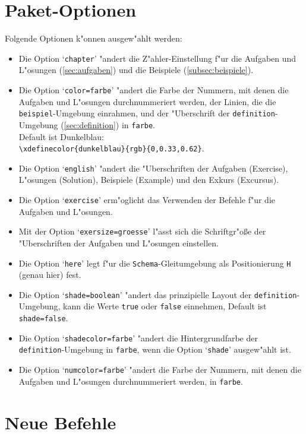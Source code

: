 \documentclass[a4paper,10pt,headsepline]{scrartcl}
\newcommand{\option}[1]{`\texttt{#1}'\xspace}
\begin{document}
\section{Paket-Optionen}
Folgende Optionen k"onnen ausgew"ahlt werden:
\begin{itemize}
 \item Die Option \option{chapter} "andert die Z"ahler-Einstellung f"ur die Aufgaben und L"osungen (\ref{sec:aufgaben}) und die Beispiele (\ref{subsec:beispiele}).%
 \item Die Option \option{color=farbe} "andert die Farbe der Nummern, mit denen die Aufgaben und L"osungen durchnummeriert werden, der Linien, die die \texttt{beispiel}-Umgebung einrahmen, und der "Uberschrift der \texttt{definition}-Umgebung (\ref{sec:definition}) in \texttt{far\-be}.\\ Default ist Dunkelblau:\\\verb=\xdefinecolor{dunkelblau}{rgb}{0,0.33,0.62}=.
 \item Die Option \option{english} "andert die "Uberschriften der Aufgaben (Exercise), L"osungen (Solution), Beispiele (Example) und den Exkurs (Excursus).
 \item Die Option \option{exercise} erm"oglicht das Verwenden der Befehle f"ur die Aufgaben und L"osungen.
 \item Mit der Option \option{exersize=groesse} l"asst sich die Schriftgr"o\ss e der "Uberschriften der Aufgaben und L"osungen einstellen.
 \item Die Option \option{here} legt f"ur die \texttt{Schema}-Gleitumgebung als Positionierung \texttt{H} (genau hier) fest.
 \item Die Option \option{shade=boolean} "andert das prinzipielle Layout der \texttt{definition}-Umgebung, kann die Werte \texttt{true} oder \texttt{false} einnehmen, Default ist \texttt{shade=false}.
 \item Die Option \option{shadecolor=farbe} "andert die Hintergrundfarbe der \texttt{definition}-Umgebung in \texttt{farbe}, wenn die Option `\texttt{shade}' ausgew"ahlt ist.
 \item Die Option \option{numcolor=farbe} "andert die Farbe der Nummern, mit denen die Aufgaben und L"osungen durchnummeriert werden, in \texttt{farbe}.
\end{itemize}

\section{Neue Befehle}
\end{document}
